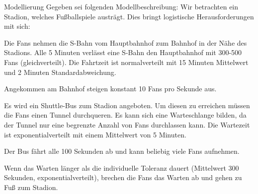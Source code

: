 \documentclass{article}
\begin{document}
\begin{exercise}{Modellierung}
  Gegeben sei folgenden Modellbeschreibung: Wir betrachten ein Stadion, welches Fußballspiele austrägt. Dies bringt logistische Herausforderungen mit sich:
  \par Die Fans nehmen die S-Bahn vom Hauptbahnhof zum Bahnhof in der Nähe des Stadions. Alle 5 Minuten verlässt eine S-Bahn den Hauptbahnhof mit 300-500 Fans (gleichverteilt). Die Fahrtzeit ist normalverteilt mit 15 Minuten Mittelwert und 2 Minuten Standardabweichung.
  \par Angekommen am Bahnhof steigen konstant 10 Fans pro Sekunde aus.
  \par Es wird ein Shuttle-Bus zum Stadion angeboten. Um diesen zu erreichen müssen die Fans einen Tunnel durchqueren. Es kann sich eine Warteschlange bilden, da der Tunnel nur eine begrenzte Anzahl von Fans durchlassen kann. Die Wartezeit ist exponentialverteilt mit einem Mittelwert von 5 Minuten.
  \par Der Bus fährt alle 100 Sekunden ab und kann beliebig viele Fans aufnehmen.
  \par Wenn das Warten länger als die individuelle Toleranz dauert (Mittelwert 300 Sekunden, exponentialverteilt), brechen die Fans das Warten ab und gehen zu Fuß zum Stadion.


\end{exercise}
\end{document}
